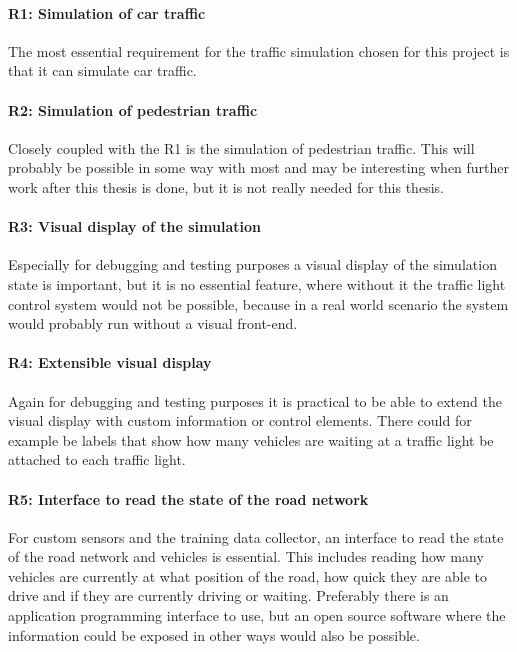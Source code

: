 \paragraph{R1: Simulation of car traffic} The most essential requirement for the traffic simulation chosen for this project is that it can simulate car traffic.

\paragraph{R2: Simulation of pedestrian traffic} Closely coupled with the R1 is the simulation of pedestrian traffic. This will probably be possible in some way with most and may be interesting when further work after this thesis is done, but it is not really needed for this thesis.

\paragraph{R3: Visual display of the simulation} Especially for debugging and testing purposes a visual display of the simulation state is important, but it is no essential feature, where without it the traffic light control system would not be possible, because in a real world scenario the system would probably run without a visual front-end.

\paragraph{R4: Extensible visual display} Again for debugging and testing purposes it is practical to be able to extend the visual display with custom information or control elements. There could for example be labels that show how many vehicles are waiting at a traffic light be attached to each traffic light.

\paragraph{R5: Interface to read the state of the road network} For custom sensors and the training data collector, an interface to read the state of the road network and vehicles is essential. This includes reading how many vehicles are currently at what position of the road, how quick they are able to drive and if they are currently driving or waiting. Preferably there is an application programming interface to use, but an open source software where the information could be exposed in other ways would also be possible.


